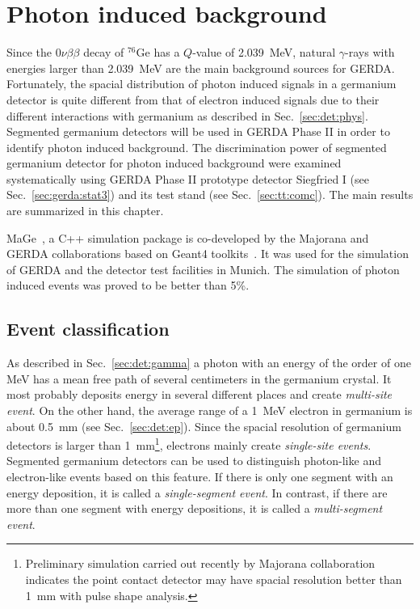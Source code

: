 \chapter{Photon induced background}
\label{cha:photon}
Since the $0\nu\beta\beta$ decay of $^{76}$Ge has a $Q$-value of 2.039~MeV, natural $\gamma$-rays with energies larger than 2.039~MeV are the main background sources for GERDA. Fortunately, the spacial distribution of photon induced signals in a germanium detector is quite different from that of electron induced signals due to their different interactions with germanium as described in Sec.~\ref{sec:det:phys}. Segmented germanium detectors will be used in GERDA Phase II in order to identify photon induced background. The discrimination power of segmented germanium detector for photon induced background were examined systematically\cite{Pid07} using GERDA Phase II prototype detector Siegfried I (see Sec.~\ref{sec:gerda:stat3}) and its test stand (see Sec.~\ref{sec:tt:comc}). The main results are summarized in this chapter. 

MaGe~\cite{Mag08}, a C++ simulation package is co-developed by the Majorana and GERDA collaborations based on Geant4 toolkits~\cite{Gea03,Gea06}. It was used for the simulation of GERDA and the detector test facilities in Munich. The simulation of photon induced events was proved to be better than 5\%.

\section{Event classification}
\label{sec:ph:eve}
As described in Sec.~\ref{sec:det:gamma} a photon with an energy of the order of one MeV has a mean free path of several centimeters in the germanium crystal. It most probably deposits energy in several different places and create \emph{multi-site event}. On the other hand, the average range of a 1~MeV electron in germanium is about 0.5~mm (see Sec.~\ref{sec:det:ep}). Since the spacial resolution of germanium detectors is larger than 1~mm\footnote{Preliminary simulation carried out recently by Majorana collaboration indicates the point contact detector may have spacial resolution better than 1~mm with pulse shape analysis.}, electrons mainly create \emph{single-site events}. Segmented germanium detectors can be used to distinguish photon-like and electron-like events based on this feature. If there is only one segment with an energy deposition, it is called a \emph{single-segment event}. In contrast, if there are more than one segment with energy depositions, it is called a \emph{multi-segment event}. 

